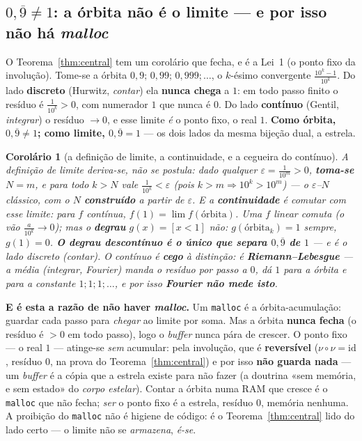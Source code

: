 \documentclass[11pt,a4paper]{article}
\newcommand{\code}[1]{\texttt{\small #1}}
\newtheorem{corolario}[teorema]{Corolário}
\begin{document}
\subsection*{$0{,}\overline9 \ne 1$: a órbita não é o limite --- e por isso não há \emph{malloc}}\label{sec:nove}

\noindent O Teorema~\ref{thm:central} tem um corolário que fecha, e é a Lei~1 (o ponto fixo da involução).
Tome-se a órbita $0{,}9;\,0{,}99;\,0{,}999;\dots$, o $k$-ésimo convergente $\frac{10^k-1}{10^k}$. Do lado
\textbf{discreto} (Hurwitz, \emph{contar}) ela \textbf{nunca chega} a $1$: em todo passo finito o resíduo
é $\frac1{10^k}>0$, com numerador $1$ que nunca é $0$. Do lado \textbf{contínuo} (Gentil, \emph{integrar})
o resíduo $\to 0$, e esse limite \emph{é} o ponto fixo, o real $1$. \textbf{Como órbita, $0{,}\overline9\ne 1$;
como limite, $0{,}\overline9 = 1$} --- os dois lados da mesma bijeção dual, a estrela.

\begin{corolario}[a definição de limite, a continuidade, e a cegueira do contínuo]\label{cor:nove}
A \emph{definição} de limite deriva-se, não se postula: dado qualquer $\varepsilon=\frac1{10^m}>0$,
\textbf{toma-se} $N=m$, e para todo $k>N$ vale $\frac1{10^k}<\varepsilon$ (pois $k>m\Rightarrow 10^k>10^m$)
--- o $\varepsilon$--$N$ clássico, com o $N$ \textbf{construído} a partir de $\varepsilon$. E a
\textbf{continuidade} é comutar com esse limite: para $f$ contínua, $f(1)=\lim f(\text{órbita})$. Uma $f$
linear comuta (o vão $\frac{a}{10^k}\to 0$); mas o \textbf{degrau} $g(x)=[x<1]$ \emph{não}: $g(\text{órbita}_k)=1$
sempre, $g(1)=0$. \textbf{O degrau descontínuo é o único que separa $0{,}\overline9$ de $1$} --- e é o lado
discreto (contar). O contínuo é \textbf{cego} à distinção: é \textbf{Riemann--Lebesgue} --- a média (integrar,
Fourier) manda o resíduo por passo a $0$, dá $1$ para a órbita \emph{e} para a constante $1;1;1;\dots$, e por
isso \textbf{Fourier não mede isto}.
\end{corolario}

\noindent \textbf{E é esta a razão de não haver \emph{malloc}.} Um \code{malloc} é a órbita-acumulação:
guardar cada passo para \emph{chegar} ao limite por soma. Mas a órbita \textbf{nunca fecha} (o resíduo é
$>0$ em todo passo), logo o \emph{buffer} nunca pára de crescer. O ponto fixo --- o real $1$ --- atinge-se
\emph{sem} acumular: pela involução, que é \textbf{reversível} ($\nu\circ\nu=\mathrm{id}$, resíduo $0$, na
prova do Teorema~\ref{thm:central}) e por isso \textbf{não guarda nada} --- um \emph{buffer} é a cópia que a
estrela existe para não fazer (a doutrina «sem memória, e sem estado» do \emph{corpo estelar}). Contar a
órbita numa RAM que cresce é o \code{malloc} que não fecha; \emph{ser} o ponto fixo é a estrela, resíduo $0$,
memória nenhuma. A proibição do \code{malloc} não é higiene de código: é o Teorema~\ref{thm:central} lido do
lado certo --- o limite não se \emph{armazena}, \emph{é-se}.
\end{document}
